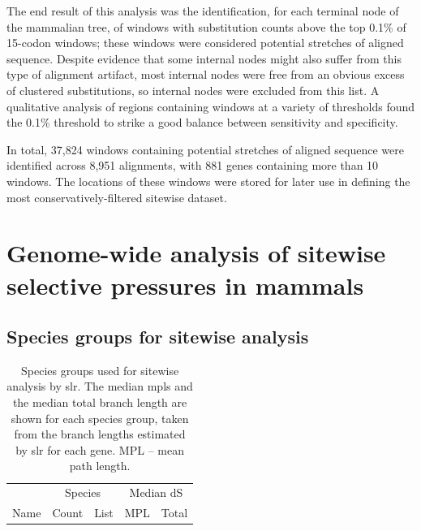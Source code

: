 
The end result of this analysis was the identification, for each
terminal node of the mammalian tree, of windows with \nsyn
substitution counts above the top 0.1\% of 15-codon windows; these
windows were considered potential stretches of \nhom aligned
sequence. Despite evidence that some internal nodes might also suffer
from this type of alignment artifact, most internal nodes were free
from an obvious excess of clustered \nsyn substitutions, so internal
nodes were excluded from this list. A qualitative analysis of regions
containing windows at a variety of thresholds found the 0.1\%
threshold to strike a good balance between sensitivity and
specificity.

In total, 37,824 windows containing potential stretches of \nhom
aligned sequence were identified across 8,951 alignments, with 881
genes containing more than 10 windows. The locations of these windows
were stored for later use in defining the most conservatively-filtered
sitewise dataset.

\section{Genome-wide analysis of sitewise selective pressures in mammals}

\subsection{Species groups for sitewise analysis}

\begin{table}
\centering \footnotesize
\begin{tabular}{lrb{8cm}rr}
\toprule
 & \multicolumn{2}{c}{Species} & \multicolumn{2}{c}{Median dS} \\
\cmidrule(r){2-3} \cmidrule{4-5}
Name & Count & List & MPL & Total \\
  \midrule

\bottomrule
\end{tabular}
\caption{Species groups used for sitewise analysis by \ac{slr}. The
  median \acp{mpl} and the median total branch length are shown for
  each species group, taken from the \ngenes branch lengths estimated
  by \ac{slr} for each gene. MPL -- mean path length.}
\label{table_species_set_summary}
\end{table}

